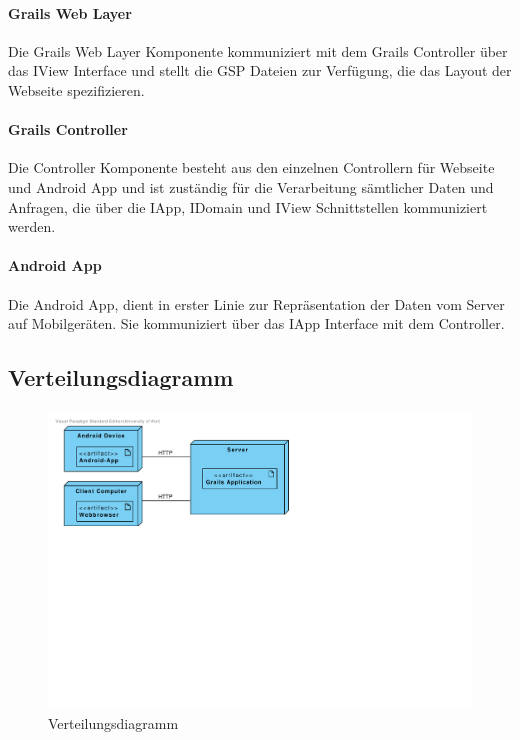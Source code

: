 \paragraph{Grails Web Layer} Die Grails Web Layer Komponente kommuniziert mit dem Grails Controller \"uber das IView Interface und stellt die GSP Dateien zur Verf\"ugung, die das Layout der Webseite spezifizieren.

\paragraph{Grails Controller} Die Controller Komponente besteht aus den einzelnen Controllern f\"ur Webseite und Android App und ist zust\"andig f\"ur die Verarbeitung s\"amtlicher Daten und Anfragen, die \"uber die IApp, IDomain und IView Schnittstellen kommuniziert werden.

\paragraph{Android App} Die Android App, dient in erster Linie zur Repr\"asentation der Daten vom Server auf Mobilger\"aten. Sie kommuniziert \"uber das IApp Interface mit dem Controller.

\subsection{Verteilungsdiagramm}

\begin{figure}[H]
  \centering
  \includegraphics[width=\textwidth, trim=1cm 12cm 12cm 1cm, clip]{gfx/deployment_diagram}
  \caption{Verteilungsdiagramm}
\end{figure}

